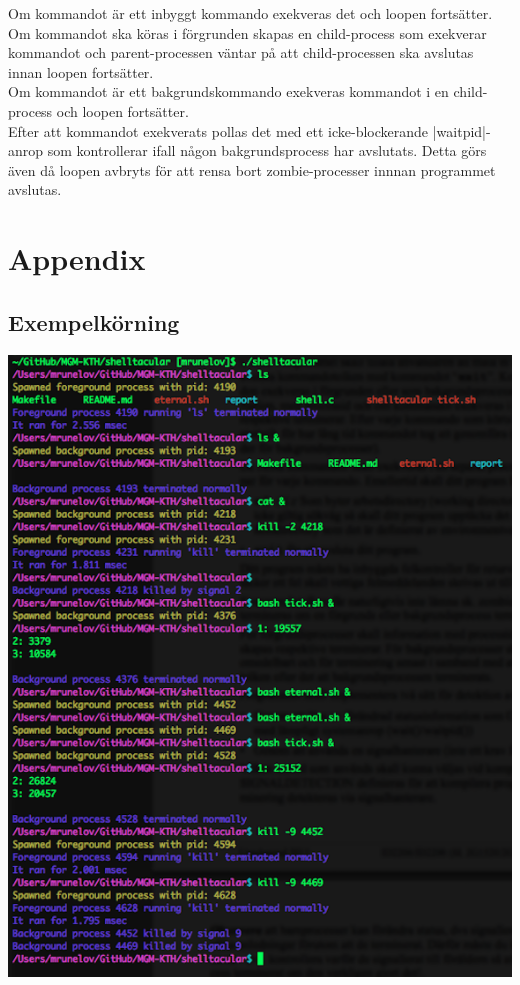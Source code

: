 \documentclass[paper=a4, fontsize=11pt]{scrartcl} %
\numberwithin{equation}{section} %
\numberwithin{figure}{section} %
\numberwithin{table}{section} %
\begin{document}
Om kommandot är ett inbyggt kommando exekveras det och loopen fortsätter.\\
Om kommandot ska köras i förgrunden skapas en child-process som exekverar kommandot
och parent-processen väntar på att child-processen ska avslutas innan loopen fortsätter.\\
Om kommandot är ett bakgrundskommando exekveras kommandot i en child-process och loopen fortsätter.\\

Efter att kommandot exekverats pollas det med ett icke-blockerande |waitpid|-anrop som kontrollerar ifall
någon bakgrundsprocess har avslutats. Detta görs även då loopen avbryts för att rensa bort zombie-processer innnan programmet avslutas.



\newpage
\section*{Appendix}
\subsection*{Exempelkörning}
\includegraphics[scale=0.7]{"test3"}


\end{document}
